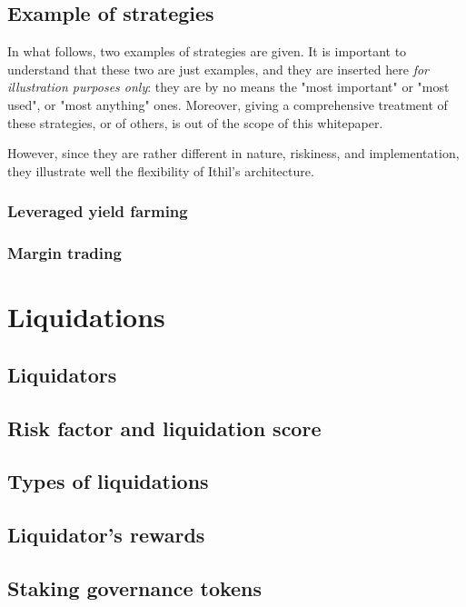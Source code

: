 \documentclass[a4paper,10 pt]{article}
\theoremstyle{definition}
\begin{document}
\subsection{Example of strategies}\label{exstrSub}

In what follows, two examples of strategies are given. It is important to understand that these two are just examples, and they are inserted here {\it for illustration purposes only}: they are by no means the "most important" or "most used", or "most anything" ones. Moreover, giving a comprehensive treatment of these strategies, or of others, is out of the scope of this whitepaper. 

However, since they are rather different in nature, riskiness, and implementation, they illustrate well the flexibility of Ithil's architecture.
 
\subsubsection{Leveraged yield farming}\label{lyfSubSub}

\subsubsection{Margin trading}\label{mtSubSub}

\section{Liquidations}\label{liqSec}
\subsection{Liquidators}\label{liqSub}
\subsection{Risk factor and liquidation score}\label{rflsSub}
\subsection{Types of liquidations}\label{tolSub}
\subsection{Liquidator's rewards}\label{liqrewSub}
\subsection{Staking governance tokens}\label{sgtSub}
\end{document}
